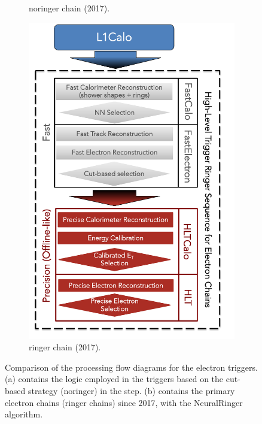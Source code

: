 \begin{figure}[h!tb]
\begin{center}
\begin{subfigure}[c]{.48\textwidth}
  \caption{noringer chain (2017).}
  \end{subfigure}
  \hfill
  \begin{subfigure}[c]{.48\textwidth}
  \centering
  \includegraphics[width=\textwidth]{sections/context/figures/ElectronChain_Run2_ringer.pdf}
  \caption{ringer chain (2017).}
  \end{subfigure}
  \caption{Comparison of the processing flow diagrams for the electron triggers. (a)
  contains the logic employed in the triggers based on the cut-based strategy
  (noringer) in the \fastcalo step. (b) contains the primary electron
  chains (ringer chains) since 2017, with the NeuralRinger algorithm.}%
  \label{fig:ringer_chains}
  \end{center}
\end{figure}

